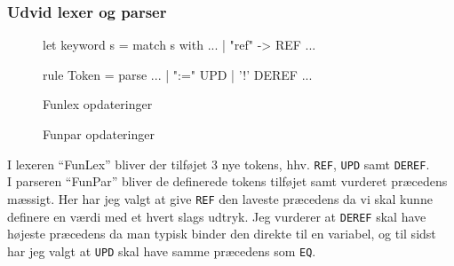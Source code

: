 \subsubsection{Udvid lexer og parser}
\begin{figure}[!ht]
    \centering
\begin{FSharp}
{
   let keyword s =
       match s with
       ...
       | "ref"  -> REF
       ...
}
   
   rule Token = parse
     ...
     | ":="            { UPD }
     | '!'             { DEREF }
     ...
\end{FSharp}
    \caption{Funlex opdateringer}
    \label{fig:2016:fslex}
\end{figure}
\begin{figure}[!ht]
    \centering
{}
    \caption{Funpar opdateringer}
    \label{fig:2016:parser}
\end{figure}
I lexeren ``FunLex'' bliver der tilføjet 3 nye tokens, hhv. \Verb|REF|, \Verb|UPD| samt \Verb|DEREF|.\\
I parseren ``FunPar'' bliver de definerede tokens tilføjet samt vurderet præcedens mæssigt. Her har jeg valgt at give \Verb|REF| den laveste præcedens da vi skal kunne definere en værdi med et hvert slags udtryk. Jeg vurderer at \Verb|DEREF| skal have højeste præcedens da man typisk binder den direkte til en variabel, og til sidst har jeg valgt at \Verb|UPD| skal have samme præcedens som \Verb|EQ|.
